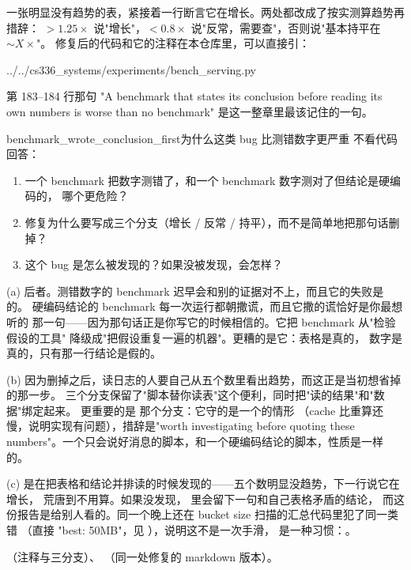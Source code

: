 一张明显没有趋势的表，紧接着一行断言它在增长。两处都改成了按实测算趋势再措辞：
$>1.25\times$ 说"增长"，$<0.8\times$ 说"反常，需要查"，否则说"基本持平在 $\sim X\times$"。
修复后的代码和它的注释在本仓库里，可以直接引：

%
  {../../cs336_systems/experiments/bench_serving.py}

第 183--184 行那句 "A benchmark that states its conclusion before reading its own numbers
is worse than no benchmark" 是这一整章里最该记住的一句。

\begin{checkpoint}{benchmark_wrote_conclusion_first}{为什么这类 bug 比测错数字更严重}
不看代码回答：
\begin{enumerate}[label=(\alph*)]
  \item 一个 benchmark 把数字测错了，和一个 benchmark 数字测对了但结论是硬编码的，
        哪个更危险？
  \item 修复为什么要写成三个分支（增长 / 反常 / 持平），而不是简单地把那句话删掉？
  \item 这个 bug 是怎么被发现的？如果没被发现，会怎样？
\end{enumerate}

\ifshowanswers
\tcblower
\answer (a) 后者。测错数字的 benchmark 迟早会和别的证据对不上，而且它的失败是的。
硬编码结论的 benchmark 每一次运行都朝撒谎，而且它撒的谎恰好是你最想听的
那一句——因为那句话正是你写它的时候相信的。它把 benchmark 从"检验假设的工具"
降级成"把假设重复一遍的机器"。更糟的是它：表格是真的，
数字是真的，只有那一行结论是假的。

(b) 因为删掉之后，读日志的人要自己从五个数里看出趋势，而这正是当初想省掉的那一步。
三个分支保留了"脚本替你读表"这个便利，同时把"读的结果"和"数据"绑定起来。
更重要的是  那个分支：它守的是一个的情形
（cache 比重算还慢，说明实现有问题），措辞是"worth investigating before quoting these
numbers"。一个只会说好消息的脚本，和一个硬编码结论的脚本，性质是一样的。

(c) 是在把表格和结论并排读的时候发现的——五个数明显没趋势，下一行说它在增长，
荒唐到不用算。如果没发现， 里会留下一句和自己表格矛盾的结论，
而这份报告是给别人看的。同一个晚上还在 bucket size 扫描的汇总代码里犯了同一类错
（直接  "best: 50MB"，见 ），说明这不是一次手滑，
是一种习惯：。

\whereincode {}（注释与三分支）、
（同一处修复的 markdown 版本）。
\fi
\end{checkpoint}

